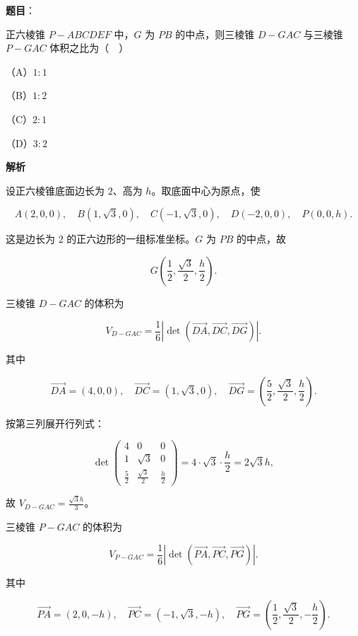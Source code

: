 \begin{answer}

\textbf{题目}：

正六棱锥 $P-ABCDEF$ 中，$G$ 为 $PB$ 的中点，则三棱锥 $D-GAC$ 与三棱锥 $P-GAC$ 体积之比为（　）

（A）$1:1$

（B）$1:2$

（C）$2:1$

（D）$3:2$

\textbf{解析}

设正六棱锥底面边长为 $2$、高为 $h$。取底面中心为原点，使

\nopagebreak[4]
\[A(2,0,0),\quad B(1,\sqrt3,0),\quad C(-1,\sqrt3,0),\quad D(-2,0,0),\quad P(0,0,h).\]

这是边长为 $2$ 的正六边形的一组标准坐标。$G$ 为 $PB$ 的中点，故

\nopagebreak[4]
\[G\left(\frac12,\frac{\sqrt3}{2},\frac h2\right).\]

三棱锥 $D-GAC$ 的体积为

\nopagebreak[4]
\[V_{D-GAC}
=\frac16\left|\det(\overrightarrow{DA},\overrightarrow{DC},\overrightarrow{DG})\right| .\]

其中

\nopagebreak[4]
\[\overrightarrow{DA}=(4,0,0),\quad
\overrightarrow{DC}=(1,\sqrt3,0),\quad
\overrightarrow{DG}=\left(\frac52,\frac{\sqrt3}{2},\frac h2\right).\]

按第三列展开行列式：

\nopagebreak[4]
\[\det
\begin{pmatrix}
4&0&0\\
1&\sqrt3&0\\
\frac52&\frac{\sqrt3}{2}&\frac h2
\end{pmatrix}
=4\cdot\sqrt3\cdot\frac h2=2\sqrt3 h,\]

故 $V_{D-GAC}=\frac{\sqrt3 h}{3}$。

三棱锥 $P-GAC$ 的体积为

\nopagebreak[4]
\[V_{P-GAC}
=\frac16\left|\det(\overrightarrow{PA},\overrightarrow{PC},\overrightarrow{PG})\right| .\]

其中

\nopagebreak[4]
\[\overrightarrow{PA}=(2,0,-h),\quad
\overrightarrow{PC}=(-1,\sqrt3,-h),\quad
\overrightarrow{PG}=\left(\frac12,\frac{\sqrt3}{2},-\frac h2\right).\]


\end{answer}
